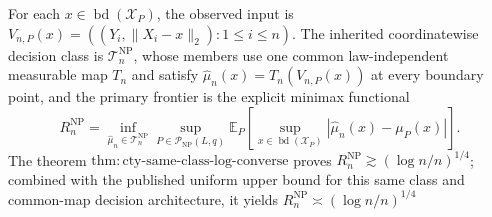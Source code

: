 For each \(x\in\operatorname{bd}(\mathcal X_P)\), the observed input is \(V_{n,P}(x)=((Y_i,\lVert X_i-x\rVert_2):1\leq i\leq n)\).  The inherited coordinatewise decision class is \(\mathcal T_n^{\mathrm{NP}}\), whose members use one common law-independent measurable map \(T_n\) and satisfy \(\widehat\mu_n(x)=T_n(V_{n,P}(x))\) at every boundary point, and the primary frontier is the explicit minimax functional
\[
 R_n^{\mathrm{NP}}
 =\inf_{\widehat\mu_n\in\mathcal T_n^{\mathrm{NP}}}
 \sup_{P\in\mathcal P_{\mathrm{NP}}(L,q)}
 \mathbb E_P\!\left[
 \sup_{x\in\operatorname{bd}(\mathcal X_P)}
 |\widehat\mu_n(x)-\mu_P(x)|
 \right].
\]
The theorem \(\mathrm{thm:cty\text{-}same\text{-}class\text{-}log\text{-}converse}\) proves \(R_n^{\mathrm{NP}}\gtrsim(\log n/n)^{1/4}\); combined with the published uniform upper bound for this same class and common-map decision architecture, it yields \(R_n^{\mathrm{NP}}\asymp(\log n/n)^{1/4}\)